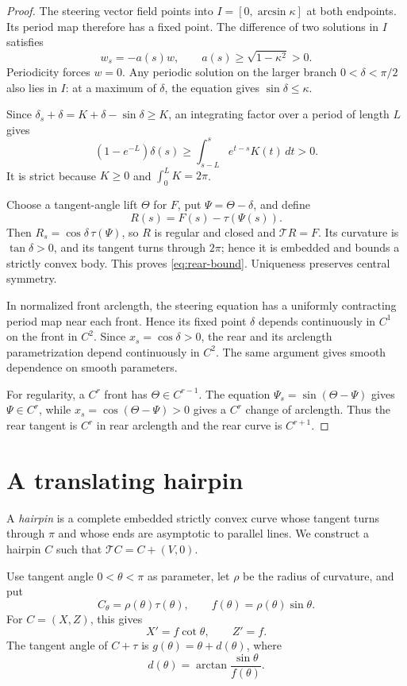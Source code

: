 \documentclass[11pt]{article}
\numberwithin{equation}{section}
\newcommand{\Tmap}{\mathcal T}
\begin{document}
\begin{proof}
The steering vector field points into \(I=[0,\arcsin\kappa]\) at both
endpoints. Its period map therefore has a fixed point. The difference of two
solutions in \(I\) satisfies
\[
  w_s=-a(s)w,\qquad a(s)\geq\sqrt{1-\kappa^2}>0.
\]
Periodicity forces \(w=0\). Any periodic solution on the larger branch \(0<\delta<\pi/2\) also lies
in \(I\): at a maximum of \(\delta\), the equation gives
\(\sin\delta\leq\kappa\).

Since \(\delta_s+\delta=K+\delta-\sin\delta\geq K\), an integrating factor
over a period of length \(L\) gives
\[
  (1-e^{-L})\delta(s)
  \geq\int_{s-L}^{s}e^{t-s}K(t)\,dt>0.
\]
It is strict because \(K\geq0\) and \(\int_0^L K=2\pi\).

Choose a tangent-angle lift \(\Theta\) for \(F\), put
\(\Psi=\Theta-\delta\), and define
\[
  R(s)=F(s)-\tau(\Psi(s)).
\]
Then \(R_s=\cos\delta\,\tau(\Psi)\), so \(R\) is regular and closed and
\(\Tmap R=F\). Its curvature is \(\tan\delta>0\), and its tangent turns
through \(2\pi\); hence it is embedded and bounds a strictly convex body.
This proves \eqref{eq:rear-bound}. Uniqueness preserves central symmetry.

In normalized front arclength, the steering equation has a uniformly
contracting period map near each front. Hence its fixed point \(\delta\)
depends continuously in \(C^1\) on the front in \(C^2\). Since
\(x_s=\cos\delta>0\), the rear and its arclength parametrization depend
continuously in \(C^2\). The same argument gives smooth dependence on smooth
parameters.

For regularity, a \(C^r\) front has \(\Theta\in C^{r-1}\). The equation
\(\Psi_s=\sin(\Theta-\Psi)\) gives \(\Psi\in C^r\), while
\(x_s=\cos(\Theta-\Psi)>0\) gives a \(C^r\) change of arclength. Thus the
rear tangent is \(C^r\) in rear arclength and the rear curve is \(C^{r+1}\).
\end{proof}

\section{A translating hairpin}\label{sec:translator}

A \emph{hairpin} is a complete embedded strictly convex curve whose tangent
turns through \(\pi\) and whose ends are asymptotic to parallel lines. We
construct a hairpin \(C\) such that \(\Tmap C=C+(V,0)\).

Use tangent angle \(0<\theta<\pi\) as parameter, let \(\rho\) be the radius
of curvature, and put
\[
  C_\theta=\rho(\theta)\tau(\theta),\qquad
  f(\theta)=\rho(\theta)\sin\theta.
\]
For \(C=(X,Z)\), this gives
\begin{equation}\label{eq:XZ}
  X'=f\cot\theta,\qquad Z'=f.
\end{equation}
The tangent angle of \(C+\tau\) is \(g(\theta)=\theta+d(\theta)\), where
\[
  d(\theta)=\arctan\frac{\sin\theta}{f(\theta)}.
\]
\end{document}
